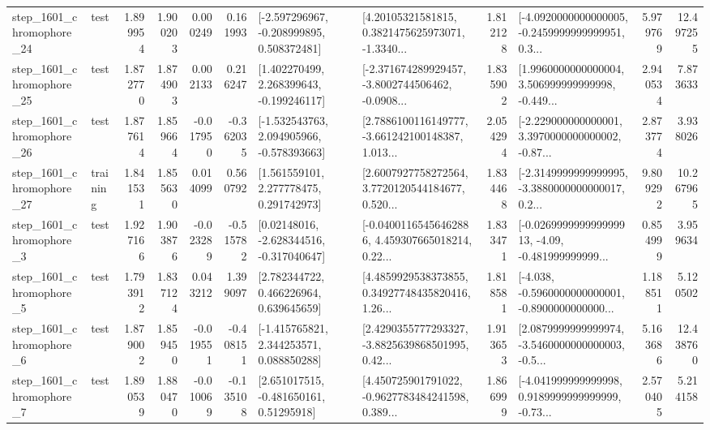 \begin{tabular}{llrrrrllrlrr}
 step\_1601\_chromophore\_24 &      test &      1.899954 &    1.900203 &      0.000249 &  0.161993 &   [-2.597296967, -0.208999895, 0.508372481] &  [4.20105321581815, 0.3821475625973071, -1.3340... &       1.812128 &  [-4.0920000000000005, -0.2459999999999951, 0.3... &            5.979769 &         12.497255 \\
 step\_1601\_chromophore\_25 &      test &      1.872770 &    1.874903 &      0.002133 &  0.216247 &    [1.402270499, 2.268399643, -0.199246117] &  [-2.371674289929457, -3.8002744506462, -0.0908... &       1.835902 &  [1.9960000000000004, 3.506999999999998, -0.449... &            2.940534 &          7.873633 \\
 step\_1601\_chromophore\_26 &      test &      1.877614 &    1.859664 &     -0.017950 & -0.362035 &   [-1.532543763, 2.094905966, -0.578393663] &  [2.7886100116149777, -3.661242100148387, 1.013... &       2.054294 &  [-2.229000000000001, 3.3970000000000002, -0.87... &            2.873774 &          3.938026 \\
 step\_1601\_chromophore\_27 &  training &      1.841531 &    1.855630 &      0.014099 &  0.560792 &     [1.561559101, 2.277778475, 0.291742973] &  [2.6007927758272564, 3.7720120544184677, 0.520... &       1.834468 &  [-2.3149999999999995, -3.3880000000000017, 0.2... &            9.809292 &         10.267965 \\
  step\_1601\_chromophore\_3 &      test &      1.927166 &    1.903876 &     -0.023289 & -0.515782 &    [0.02148016, -2.628344516, -0.317040647] &  [-0.04001165456462886, 4.459307665018214, 0.22... &       1.833471 &  [-0.026999999999999913, -4.09, -0.481999999999... &            0.854999 &          3.959634 \\
  step\_1601\_chromophore\_5 &      test &      1.793912 &    1.837124 &      0.043212 &  1.399097 &     [2.782344722, 0.466226964, 0.639645659] &  [4.4859929538373855, 0.34927748435820416, 1.26... &       1.818581 &  [-4.038, -0.5960000000000001, -0.8900000000000... &            1.188511 &          5.120502 \\
  step\_1601\_chromophore\_6 &      test &      1.879002 &    1.859450 &     -0.019551 & -0.408151 &    [-1.415765821, 2.344253571, 0.088850288] &  [2.4290355777293327, -3.8825639868501995, 0.42... &       1.913653 &  [2.0879999999999974, -3.5460000000000003, -0.5... &            5.163686 &         12.438760 \\
  step\_1601\_chromophore\_7 &      test &      1.890539 &    1.880470 &     -0.010069 & -0.135108 &     [2.651017515, -0.481650161, 0.51295918] &  [4.450725901791022, -0.9627783484241598, 0.389... &       1.866999 &  [-4.041999999999998, 0.9189999999999999, -0.73... &            2.570405 &          5.214158 \\

\end{tabular}
